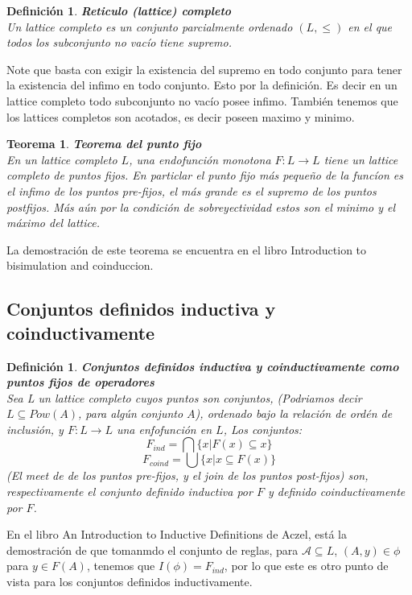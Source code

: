 \documentclass[executivepaper]{article}
\newtheorem{teo}[propo]{Teorema}
\newtheorem{defi}[propo]{Definición}
\newcommand{\A}{\mathcal{A}}
\begin{document}
\begin{defi}\textbf{Reticulo (lattice) completo}\\
    Un lattice completo es un conjunto parcialmente ordenado $(L,\leq)$ en el que todos los subconjunto no vacío tiene supremo.
\end{defi}
Note que basta con exigir la existencia del supremo en todo conjunto para tener la existencia del infimo en todo conjunto. Esto por la definición. Es decir en un lattice completo todo subconjunto no vacío posee infimo. También tenemos que los lattices completos son acotados, es decir poseen maximo y minimo.

\begin{teo}\textbf{Teorema del punto fijo}\\
    En un lattice completo $L$, una endofunción monotona $F:L\rightarrow L$ tiene un lattice completo de puntos fijos. En particlar el punto fijo más pequeño de la funcíon es el infimo de los puntos pre-fijos, el más grande es el supremo de los puntos postfijos. Más aún por la condición de sobreyectividad estos son el minimo y el máximo del lattice. 
\end{teo}
La demostración de este teorema se encuentra en el libro Introduction to bisimulation and coinduccion.
\subsection*{Conjuntos definidos inductiva y coinductivamente}

\begin{defi}\textbf{Conjuntos definidos inductiva y coinductivamente como puntos fijos de operadores} \\
    Sea L un lattice completo cuyos puntos son conjuntos, (Podriamos decir $L\subseteq Pow(A)$, para algún conjunto $A$), ordenado bajo la relación de ordén de inclusión, y $F:L\rightarrow L$ una enfofunción en $L$, Los conjuntos:
    $$F_{ind} = \bigcap \{x|F(x)\subseteq x\}$$
    $$F_{coind} = \bigcup \{x|x\subseteq F(x)\}$$
    (El meet de de los puntos pre-fijos, y el join de los puntos post-fijos) son, respectivamente el conjunto definido inductiva por $F$ y definido coinductivamente por $F$.
\end{defi}

En el libro An Introduction to Inductive Definitions de Aczel, está la demostración de que tomanmdo el conjunto de reglas, para $\A\subseteq L$, $(A,y)\in\phi$ para $y\in F(A)$, tenemos que $I(\phi) = F_{ind}$, por lo que este es otro punto de vista para los conjuntos definidos inductivamente.  
\end{document}
